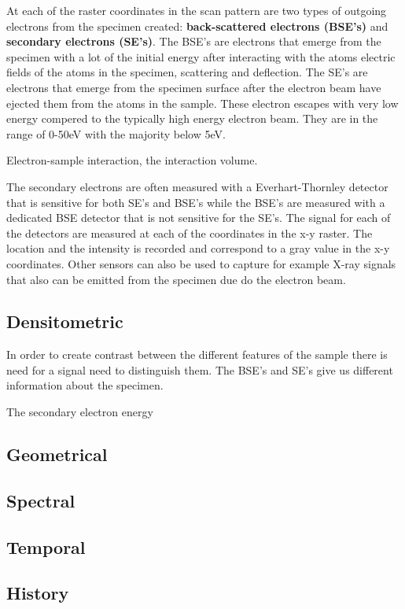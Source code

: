 At each of the raster coordinates in the scan pattern are two types of outgoing electrons from the specimen created: \textbf{back-scattered electrons (BSE's)} and \textbf{secondary electrons (SE's)}. The BSE's are electrons that emerge from the specimen with a lot of the initial energy after interacting with the atoms electric fields of the atoms in the specimen, scattering and deflection. The SE's are electrons that emerge from the specimen surface after the electron beam have ejected them from the atoms in the sample. These electron escapes with very low energy compered to the typically high energy electron beam. They are in the range of 0-50eV with the majority below 5eV. 


Electron-sample interaction, the interaction volume. 

The secondary electrons are often measured with a Everhart-Thornley detector that is sensitive for both SE's and BSE's while the BSE's are measured with a dedicated BSE detector that is not sensitive for the SE's. The signal for each of the detectors are measured at each of the coordinates in the x-y raster. The location and the intensity is recorded and correspond to a gray value in the x-y coordinates. Other sensors can also be used to capture for example X-ray signals that also can be emitted from the specimen due do the electron beam.


\subsection*{Densitometric}
In order to create contrast between the different features of the sample there is need for a signal need to distinguish them. The BSE's and SE's give us different information about the specimen.

The secondary electron energy 

\subsection*{Geometrical}

\subsection*{Spectral}

\subsection*{Temporal}

\subsection*{History}




